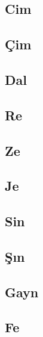 \subsection*{Cim}
\uyumluharftablo{\arcim}{\latupcim\latdowncim}{\isimcim}{\trtlfcim}

\subsection*{Çim}
\uyumluharftablo{\archim}{\latupchim\latdownchim}{\isimchim}{\trtlfchim}


\subsection*{Dal}
\uyumluharftablo{\ardal}{\latupdal\latdowndal}{\isimdal}{\trtlfdal}

\subsection*{Re}
\uyumluharftablo{\arre}{\latupre\latdownre}{\isimre}{\trtlfre}

\subsection*{Ze}
\uyumluharftablo{\arze}{\latupze\latdownze}{\isimze}{\trtlfze}

\subsection*{Je}
\uyumluharftablo{\arje}{\latupje\latdownje}{\isimje}{\trtlfje}

\subsection*{Sin}
\uyumluharftablo{\arsin}{\latupsin\latdownsin}{\isimsin}{\trtlfsin}

\subsection*{Şın}
\uyumluharftablo{\arshin}{\latupshin\latdownshin}{\isimshin}{\trtlfshin}

\subsection*{Gayn}
\uyumluharftablo{\argayn}{\latupgayn\latdowngayn}{\isimgayn}{\trtlfgayn}

\subsection*{Fe}
\uyumluharftablo{\arfe}{\latupfe\latdownfe}{\isimfe}{\trtlffe}

